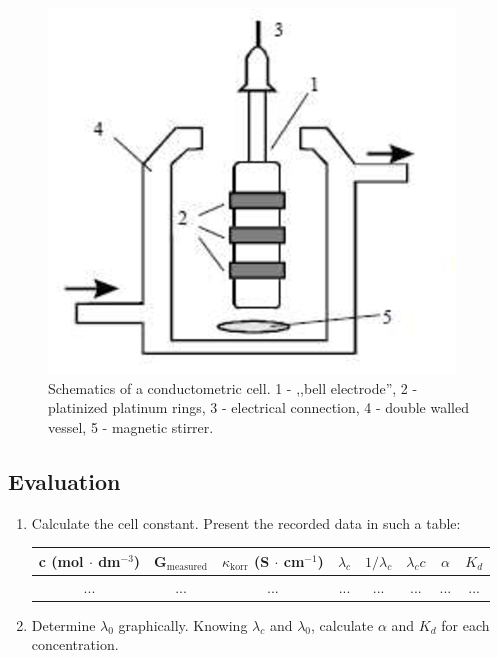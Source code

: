 \begin{figure}
\centering
\includegraphics{cond.eps}
\caption{Schematics of a conductometric cell. 1 - ,,bell electrode'', 2 - platinized platinum rings, 3 - electrical connection, 4 - double walled vessel, 5 - magnetic stirrer.}
\label{fig:vez}
\end{figure}

\subsection{Evaluation}

\begin{enumerate}
\item Calculate the cell constant.
Present the recorded data in such a table:

\begin{table}[!h]
\centering
\begin{tabular}{|c|c|c|c|c|c|c|c|}
\hline
c (mol $\cdot$ dm$^{-3}$) & G$_{\text{measured}}$ & $\kappa_{\text{korr}}$ (S $\cdot$ cm$^{-1}$) & $\lambda_c$ & $1/\lambda_c$ & $\lambda_c c$ & $\alpha$ & $K_d$ \\
\hline
... & ... & ... & ... & ... & ... & ... & ... \\
\end{tabular}
\label{table:vez}
\end{table}

\item Determine $\lambda_0$ graphically. Knowing $\lambda_c$ and $\lambda_0$, calculate $\alpha$ and $K_d$ for each concentration.

\end{enumerate}


